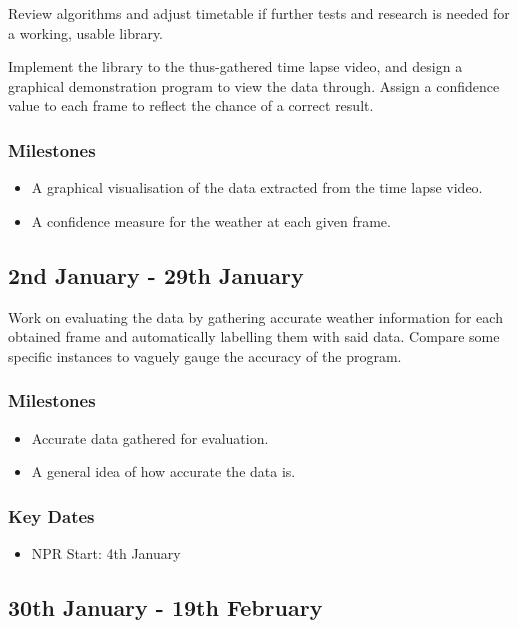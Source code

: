 \documentclass[12pt]{article}
\begin{document}
Review algorithms and adjust timetable if further tests and research is needed for a working, usable library.

Implement the library to the thus-gathered time lapse video, and design a graphical demonstration program to view the data through.
Assign a confidence value to each frame to reflect the chance of a correct result.

\subsubsection*{Milestones}
\begin{itemize}
	\item A graphical visualisation of the data extracted from the time lapse video.
	\item A confidence measure for the weather at each given frame.
\end{itemize}

\subsection*{2nd January - 29th January}%

Work on evaluating the data by gathering accurate weather information for each obtained frame and automatically labelling them with said data. 
Compare some specific instances to vaguely gauge the accuracy of the program.

\subsubsection*{Milestones}
\begin{itemize}
	\item Accurate data gathered for evaluation.
	\item A general idea of how accurate the data is.
\end{itemize}

\subsubsection*{Key Dates}
\begin{itemize}
	\item NPR Start: 4th January
\end{itemize}

\subsection*{30th January - 19th February}%
\end{document}
